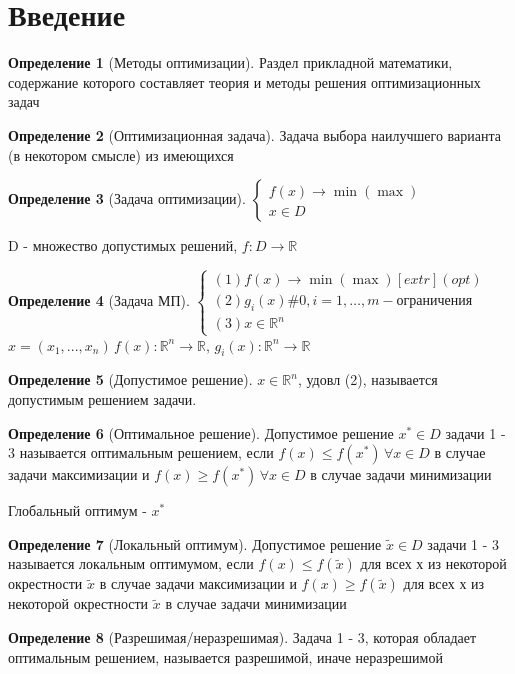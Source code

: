 \documentclass[a4paper]{article}
\theoremstyle{definition}
\newtheorem*{definition}{Определение}
\theoremstyle{remark}
\begin{document}
\tableofcontents
\section{Введение}
\begin{definition}[Методы оптимизации]
    Раздел прикладной математики, содержание которого составляет теория и методы решения оптимизационных задач
\end{definition}
\begin{definition}[Оптимизационная задача]
    Задача выбора наилучшего варианта (в некотором смысле) из имеющихся
\end{definition}
\begin{definition}[Задача оптимизации]
        $\begin{cases}
        f(x)\to \min(\max) \\
        x\in D
    \end{cases}$
\end{definition}
D - множество допустимых решений, $f:D\to \mathbb{R}$
\begin{definition}[Задача МП]
    $\begin{cases}
        (1) f(x)\to \min (\max) [extr] (opt)\\
        (2) g_i(x) \# 0, i=1,\dots, m - \text{ограничения} \\
        (3)x\in \mathbb{R}^n 
    \end{cases}$
    \(x = (x_1, ..., x_n) \, f(x): \mathbb{R}^n \to \mathbb{R}, \, g_i(x) : \mathbb{R}^n \to \mathbb{R}\)
\end{definition}
\begin{definition}[Допустимое решение]
    $x\in \mathbb{R}^n$, удовл (2), называется допустимым решением задачи.
\end{definition}
\begin{definition}[Оптимальное решение]
    Допустимое решение $x^*\in D$ задачи 1 - 3 называется оптимальным решением, если $f(x) \leq f(x^*) \, \forall x\in D$ в случае задачи максимизации и $f(x) \geq f(x^*) \, \forall x\in D$ в случае задачи минимизации
\end{definition}
Глобальный оптимум -  $x^*$
\begin{definition}[Локальный оптимум]
    Допустимое решение $\widetilde{x}\in D$ задачи 1 - 3 называется локальным оптимумом, если $f(x) \leq f(\widetilde{x})$ для всех х из некоторой окрестности $\widetilde{x}$ в случае задачи максимизации и $f(x) \geq f(\widetilde{x})$ для всех х из некоторой окрестности $\widetilde{x}$ в случае задачи минимизации
\end{definition}
\begin{definition}[Разрешимая/неразрешимая]
    Задача 1 - 3, которая обладает оптимальным решением, называется разрешимой, иначе неразрешимой
\end{definition}
\end{document}
